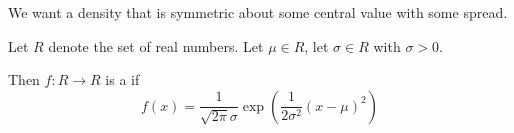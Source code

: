 

We want a density that is
symmetric about some central
value with some spread.


Let $R$ denote the set of real numbers.
Let $\mu \in R$, let $\sigma \in R$
with $\sigma > 0$.

Then $f: R \to R$ is a 
if
\[
  f(x) = \frac{1}{\sqrt{2\pi}\sigma}\exp\left(\frac{1}{2\sigma^2}(x - \mu)^2\right)
\]
